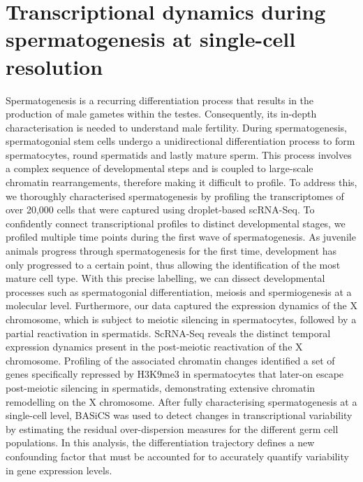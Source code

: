 
\chapter{Transcriptional dynamics during spermatogenesis at single-cell resolution}  

\graphicspath{{"../Figs/Chapter4/"}}

\begin{Abstract}
\hspace{-5mm} Spermatogenesis is a recurring differentiation process that results in the production of male gametes within the testes. Consequently, its in-depth characterisation is needed to understand male fertility. During spermatogenesis, spermatogonial stem cells undergo a unidirectional differentiation process to form spermatocytes, round spermatids and lastly mature sperm. This process involves a complex sequence of developmental steps and is coupled to large-scale chromatin rearrangements, therefore making it difficult to profile. To address this, we thoroughly characterised spermatogenesis by   profiling the transcriptomes of over 20,000 cells that were captured using droplet-based scRNA-Seq. To confidently connect transcriptional profiles to distinct developmental stages, we profiled multiple time points during the first wave of spermatogenesis. As juvenile animals progress through spermatogenesis for the first time, development has only progressed to a certain point, thus allowing the identification of the most mature cell type. With this precise labelling, we can dissect developmental processes such as spermatogonial differentiation, meiosis and spermiogenesis at a molecular level. Furthermore, our data captured the expression dynamics of the X chromosome, which is subject to meiotic silencing in spermatocytes, followed by a partial reactivation in spermatids. ScRNA-Seq reveals the distinct temporal expression dynamics present in the post-meiotic reactivation of the X chromosome. Profiling of the associated chromatin changes identified a set of genes specifically repressed by H3K9me3 in spermatocytes that later-on escape post-meiotic silencing in spermatids, demonstrating extensive chromatin remodelling on the X chromosome. After fully characterising spermatogenesis at a single-cell level, BASiCS was used to detect changes in transcriptional variability by estimating the residual over-dispersion measures for the different germ cell populations. In this analysis, the differentiation trajectory defines a new confounding factor that must be accounted for to accurately quantify variability in gene expression levels.  
\end{Abstract}

